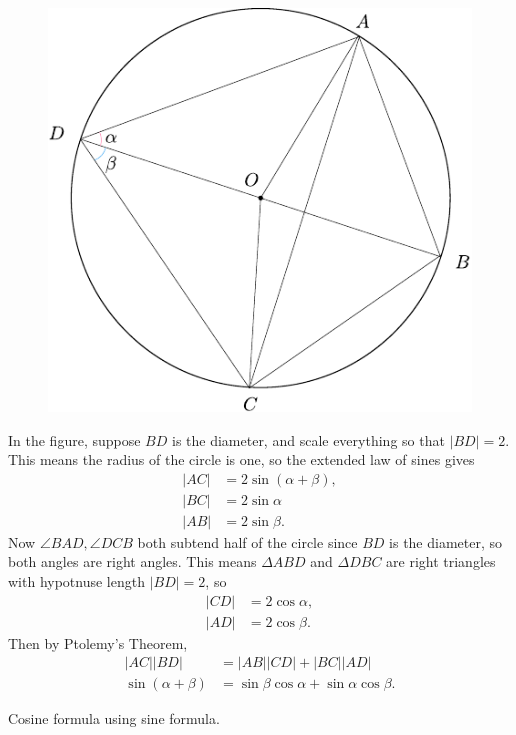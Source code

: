 \documentclass[twoside,10pt]{article}
\begin{document}
\begin{figure}[H]
	\centering
	\includegraphics[scale=1]{fig/111.pdf}
\end{figure}

In the figure, suppose $BD$ is the diameter, and scale everything so that $|BD|=2$. This means the radius of the circle is one, so the extended law of sines gives
\begin{align*}
	|AC| &= 2 \sin(\alpha+\beta),\\
	|BC| &= 2 \sin \alpha \\
	|AB| &= 2 \sin \beta.
\end{align*}
Now $\angle BAD, \angle DCB$ both subtend half of the circle since $BD$ is the diameter, so both angles are right angles. This means $\Delta ABD$ and $\Delta DBC$ are right triangles with hypotnuse length $|BD|=2$, so
\begin{align*}
	|CD| &= 2 \cos \alpha, \\
	|AD| &= 2 \cos \beta.
\end{align*}
Then by Ptolemy's Theorem,
\begin{align*}
	|AC| |BD| &= |AB| |CD| + |BC| |AD| \\
	\sin(\alpha+\beta) &= \sin \beta \cos \alpha + \sin \alpha \cos \beta.
\end{align*}

\newpage

\begin{exer}[1.112]
	Cosine formula using sine formula.
\end{exer}
\end{document}
